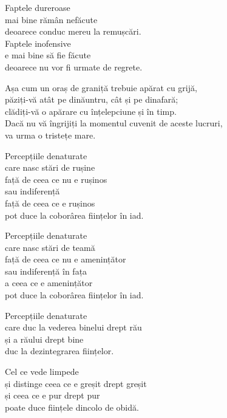 Faptele dureroase\\
mai bine rămân nefăcute\\
deoarece conduc mereu la remușcări.\\
Faptele inofensive\\
e mai bine să fie făcute\\
deoarece nu vor fi urmate de regrete.


Așa cum un oraș de graniță trebuie apărat cu grijă,\\
păziți-vă atât pe dinăuntru, cât și pe dinafară;\\
clădiți-vă o apărare cu înțelepciune și în timp.\\
Dacă nu vă îngrijiți la momentul cuvenit de aceste lucruri,\\
va urma o tristețe mare.


Percepțiile denaturate\\
care nasc stări de rușine\\
față de ceea ce nu e rușinos\\
sau indiferență\\
față de ceea ce e rușinos\\
pot duce la coborârea ființelor în iad.


Percepțiile denaturate\\
care nasc stări de teamă\\
față de ceea ce nu e amenințător\\
sau indiferență în fața\\
a ceea ce e amenințător\\
pot duce la coborârea ființelor în iad.


Percepțiile denaturate\\
care duc la vederea binelui drept rău\\
și a răului drept bine\\
duc la dezintegrarea ființelor.


Cel ce vede limpede\\
și distinge ceea ce e greșit drept greșit\\
și ceea ce e pur drept pur\\
poate duce ființele dincolo de obidă.
